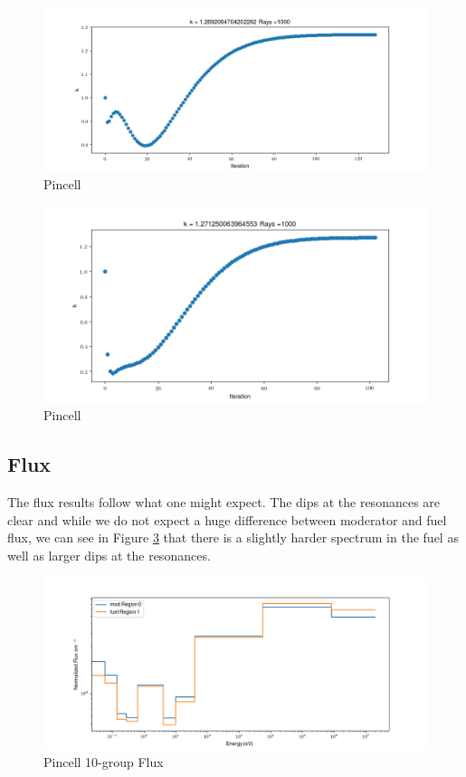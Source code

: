 \documentclass[10pt,letter]{article}
\begin{document}
\begin{figure}[H]
    \centering
    \includegraphics[width=1.05\textwidth]{figs/pincell_ks.png}
    \caption{Pincell}
    \label{fig:5}
\end{figure}
\begin{figure}[H]
    \centering
    \includegraphics[width=1.05\textwidth]{figs/3by3_ks.png}
    \caption{Pincell}
    \label{fig:5}
\end{figure}
\subsection{Flux} 
The flux results follow what one might expect. The dips at the resonances are clear and while we do not expect a huge difference between moderator and fuel flux, we can see in Figure \ref{fig:flux} that there is a slightly harder spectrum in the fuel as well as larger dips at the resonances. 
\begin{figure}[H]
    \centering
    \includegraphics[width=1.05\textwidth]{figs/pincell_flux.png}
    \caption{Pincell 10-group Flux}
    \label{fig:flux}
\end{figure}
\end{document}
